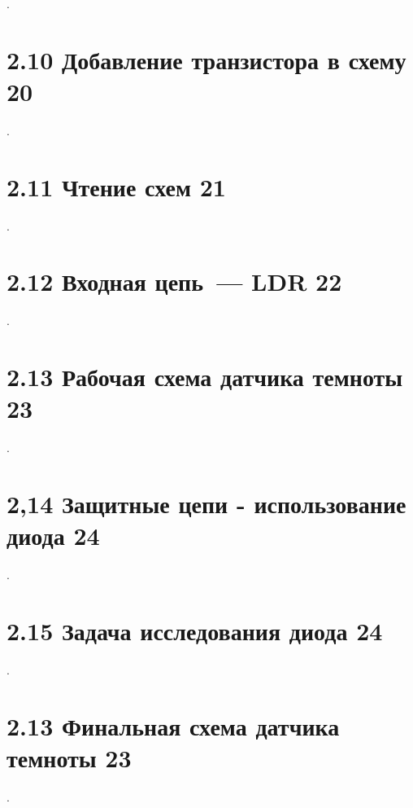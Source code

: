 .

\section{2.10 Добавление транзистора в схему 20}

.

\section{2.11 Чтение схем 21}

.

\section{2.12 Входная цепь\ --- LDR 22}

.

\section{2.13 Рабочая схема датчика темноты 23}

.

\section{2,14 Защитные цепи - использование диода 24}

.

\section{2.15 Задача исследования диода 24}

.

\section{2.13 Финальная схема датчика темноты 23}

.

